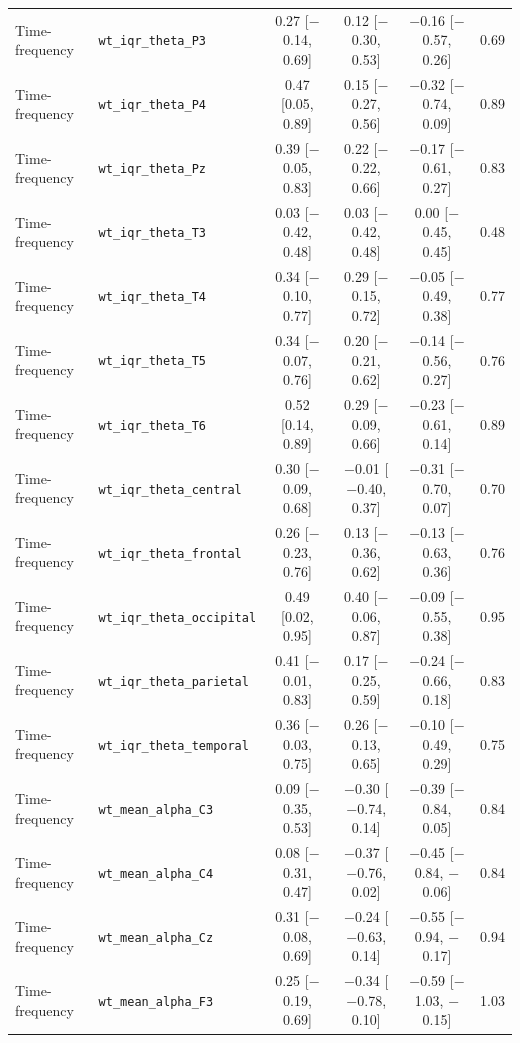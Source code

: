 {\begin{longtable}{llcccc}
Time-frequency & \texttt{wt\_iqr\_theta\_P3} & 0.27 [$-$0.14, 0.69] & 0.12 [$-$0.30, 0.53] & $-$0.16 [$-$0.57, 0.26] & 0.69 \\
Time-frequency & \texttt{wt\_iqr\_theta\_P4} & 0.47 [0.05, 0.89] & 0.15 [$-$0.27, 0.56] & $-$0.32 [$-$0.74, 0.09] & 0.89 \\
Time-frequency & \texttt{wt\_iqr\_theta\_Pz} & 0.39 [$-$0.05, 0.83] & 0.22 [$-$0.22, 0.66] & $-$0.17 [$-$0.61, 0.27] & 0.83 \\
Time-frequency & \texttt{wt\_iqr\_theta\_T3} & 0.03 [$-$0.42, 0.48] & 0.03 [$-$0.42, 0.48] & 0.00 [$-$0.45, 0.45] & 0.48 \\
Time-frequency & \texttt{wt\_iqr\_theta\_T4} & 0.34 [$-$0.10, 0.77] & 0.29 [$-$0.15, 0.72] & $-$0.05 [$-$0.49, 0.38] & 0.77 \\
Time-frequency & \texttt{wt\_iqr\_theta\_T5} & 0.34 [$-$0.07, 0.76] & 0.20 [$-$0.21, 0.62] & $-$0.14 [$-$0.56, 0.27] & 0.76 \\
Time-frequency & \texttt{wt\_iqr\_theta\_T6} & 0.52 [0.14, 0.89] & 0.29 [$-$0.09, 0.66] & $-$0.23 [$-$0.61, 0.14] & 0.89 \\
Time-frequency & \texttt{wt\_iqr\_theta\_central} & 0.30 [$-$0.09, 0.68] & $-$0.01 [$-$0.40, 0.37] & $-$0.31 [$-$0.70, 0.07] & 0.70 \\
Time-frequency & \texttt{wt\_iqr\_theta\_frontal} & 0.26 [$-$0.23, 0.76] & 0.13 [$-$0.36, 0.62] & $-$0.13 [$-$0.63, 0.36] & 0.76 \\
Time-frequency & \texttt{wt\_iqr\_theta\_occipital} & 0.49 [0.02, 0.95] & 0.40 [$-$0.06, 0.87] & $-$0.09 [$-$0.55, 0.38] & 0.95 \\
Time-frequency & \texttt{wt\_iqr\_theta\_parietal} & 0.41 [$-$0.01, 0.83] & 0.17 [$-$0.25, 0.59] & $-$0.24 [$-$0.66, 0.18] & 0.83 \\
Time-frequency & \texttt{wt\_iqr\_theta\_temporal} & 0.36 [$-$0.03, 0.75] & 0.26 [$-$0.13, 0.65] & $-$0.10 [$-$0.49, 0.29] & 0.75 \\
Time-frequency & \texttt{wt\_mean\_alpha\_C3} & 0.09 [$-$0.35, 0.53] & $-$0.30 [$-$0.74, 0.14] & $-$0.39 [$-$0.84, 0.05] & 0.84 \\
Time-frequency & \texttt{wt\_mean\_alpha\_C4} & 0.08 [$-$0.31, 0.47] & $-$0.37 [$-$0.76, 0.02] & $-$0.45 [$-$0.84, $-$0.06] & 0.84 \\
Time-frequency & \texttt{wt\_mean\_alpha\_Cz} & 0.31 [$-$0.08, 0.69] & $-$0.24 [$-$0.63, 0.14] & $-$0.55 [$-$0.94, $-$0.17] & 0.94 \\
Time-frequency & \texttt{wt\_mean\_alpha\_F3} & 0.25 [$-$0.19, 0.69] & $-$0.34 [$-$0.78, 0.10] & $-$0.59 [$-$1.03, $-$0.15] & 1.03 \\

\end{longtable}}
